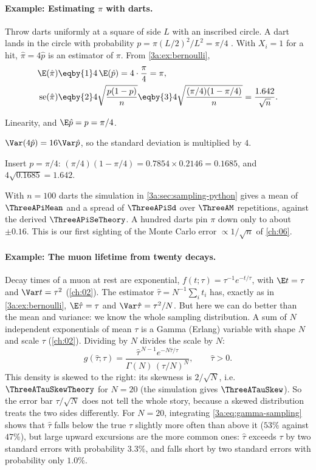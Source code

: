 \paragraph{Example: Estimating $\pi$ with darts.}
\label{3a:ex:darts}
Throw darts uniformly at a square of side $L$ with an inscribed circle. A dart
lands in the circle with probability
$p=\pi(L/2)^2/L^2=\pi/4$ . With $X_i=1$ for
a hit, $\hat\pi=4\hat p$ is an estimator of $\pi$. From
\cref{3a:ex:bernoulli},
\begin{align*}
  \E(\hat\pi) &\eqby{1} 4\,\E(\hat p)=4\cdot\frac\pi4=\pi,\\
  \operatorname{se}(\hat\pi) &\eqby{2} 4\sqrt{\frac{p(1-p)}{n}}
     \eqby{3} 4\sqrt{\frac{(\pi/4)(1-\pi/4)}{n}}
     = \frac{1.642}{\sqrt n}.
\end{align*}
\begin{explain}
  \item Linearity, and $\E\hat p=p=\pi/4$.
  \item $\Var(4\hat p)=16\Var\hat p$, so the standard deviation is multiplied by $4$.
  \item Insert $p=\pi/4$: $(\pi/4)(1-\pi/4)=0.7854\times0.2146=0.1685$, and $4\sqrt{0.1685}=1.642$.
\end{explain}
With $n=100$ darts the simulation in \cref{3a:sec:sampling-python} gives a
mean of $\ThreeAPiMean$ and a spread of $\ThreeAPiSd$ over $\ThreeAM$
repetitions, against the derived $\ThreeAPiSeTheory$. A hundred darts pin
$\pi$ down only to about $\pm0.16$. This is our first sighting of the
Monte Carlo error $\propto1/\sqrt n$ of \cref{ch:06}.

\paragraph{Example: The muon lifetime from twenty decays.}
\label{3a:ex:lifetime}
Decay times of a muon at rest are exponential, $f(t;\tau)=\tau^{-1}e^{-t/\tau}$,
with $\E t=\tau$ and $\Var t=\tau^2$ (\cref{ch:02}). The estimator
$\hat\tau=N^{-1}\sum_it_i$ has, exactly as in \cref{3a:ex:bernoulli},
$\E\hat\tau=\tau$ and $\Var\hat\tau=\tau^2/N$. But here we can do better than
the mean and variance: we know the whole sampling distribution. A sum of $N$
independent exponentials of mean $\tau$ is a Gamma (Erlang) variable with
shape $N$ and scale $\tau$ (\cref{ch:02}). Dividing by $N$ divides the scale
by $N$:
\begin{equation}
  g(\hat\tau;\tau)=\frac{\hat\tau^{\,N-1}e^{-N\hat\tau/\tau}}{\Gamma(N)\,(\tau/N)^N},
  \qquad \hat\tau>0 .
  \label{3a:eq:gamma-sampling}
\end{equation}
This density is skewed to the right: its skewness is $2/\sqrt N$, i.e.
$\ThreeATauSkewTheory$ for $N=20$ (the simulation gives $\ThreeATauSkew$).
So the error bar $\tau/\sqrt N$ does not tell the whole story, because a
skewed distribution treats the two sides differently. For $N=20$, integrating
\eqref{3a:eq:gamma-sampling} shows that $\hat\tau$ falls below the true $\tau$
slightly more often than above it ($53\%$ against $47\%$), but large upward
excursions are the more common ones: $\hat\tau$ exceeds $\tau$ by two standard
errors with probability $3.3\%$, and falls short by two standard errors with
probability only $1.0\%$.

